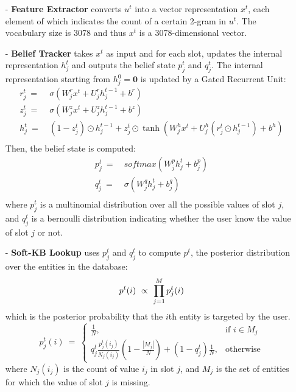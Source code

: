 \begin{itemize}
\item[-] \textbf{Feature Extractor} converts $u^{t}$ into a vector representation $x^{t}$, each element of which indicates the count of a certain 2-gram in $u^{t}$. The vocabulary size is 3078 and thus $x^{t}$ is a 3078-dimensional vector.

\item[-] \textbf{Belief Tracker} takes $x^{t}$ as input and for each slot, updates the internal representation $h^{t}_{j}$ and outputs the belief state $p^{t}_{j}$ and $q^{t}_{j}$. The internal representation starting from $h^{0}_{j}=\mathbf{0}$ is updated by a Gated Recurrent Unit:
\begin{equation}
\begin{aligned}
r^{t}_{j} \ =& \ \sigma( W^{r}_{j}x^{t} + U^{r}_{j}h^{t-1}_{j} + b^{r} ) \\
z^{t}_{j} \ =& \ \sigma( W^{z}_{j}x^{t} + U^{z}_{j}h^{t-1}_{j} + b^{z} ) \\
h^{t}_{j} \ =& \ (1-z^{t}_{j}) \odot h^{t-1}_{j} + z^{t}_{j} \odot \tanh( W^{h}_{j}x^{t} + U^{h}_{j}(r^{t}_{j} \odot h^{t-1}_{j}) + b^{h} ) \\
\end{aligned}
\end{equation}
Then, the belief state is computed:
\begin{equation}
\begin{aligned}
p^{t}_{j} \ =& \ softmax( W^{p}_{j}h^{t}_{j} + b^{p}_{j} ) \\
q^{t}_{j} \ =& \ \sigma( W^{q}_{j}h^{t}_{j} + b^{q}_{j} ) \\
\end{aligned}
\end{equation}
where $p^{t}_{j}$ is a multinomial distribution over all the possible values of slot $j$, and $q^{t}_{j}$ is a bernoulli distribution indicating whether the user know the value of slot $j$ or not.

\item[-] \textbf{Soft-KB Lookup} uses $p^{t}_{j}$ and $q^{t}_{j}$ to compute $p^{t}$, the posterior distribution over the entities in the database:
\begin{equation}
p^{t}(i) \ \propto \ \prod_{j=1}^{M} p^{t}_{j} (i) \\
\end{equation}
which is the posterior probability that the $i$th entity is targeted by the user.
\[
    p^{t}_{j}(i) \ = \
\begin{cases}
    \frac{1}{N},                                                                                     & \text{if } i \in M_{j} \\
    q^{t}_{j}\frac{p^{t}_{j}(i_{j})}{N_{j}(i_{j})} (1- \frac{|M_{j}|}{N}) + (1-q^{t}_{j})\frac{1}{N},& \text{otherwise}
\end{cases}
\]
where $N_{j}(i_{j})$ is the count of value $i_{j}$ in slot $j$, and $M_{j}$ is the set of entities for which the value of slot $j$ is missing.


\end{itemize}
